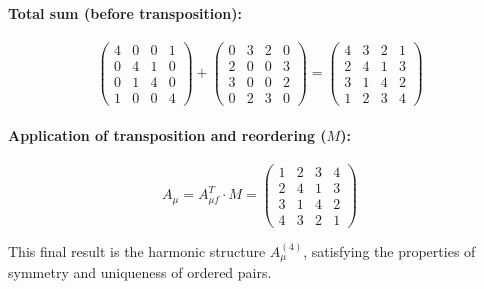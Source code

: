 \documentclass{article}
\begin{document}
\paragraph{Total sum (before transposition):}


\[
\begin{pmatrix}
4 & 0 & 0 & 1\\
0 & 4 & 1 & 0\\
0 & 1 & 4 & 0\\
1 & 0 & 0 & 4
\end{pmatrix}
+
\begin{pmatrix}
0 & 3 & 2 & 0\\
2 & 0 & 0 & 3\\
3 & 0 & 0 & 2\\
0 & 2 & 3 & 0
\end{pmatrix}
=
\begin{pmatrix}
4 & 3 & 2 & 1\\
2 & 4 & 1 & 3\\
3 & 1 & 4 & 2\\
1 & 2 & 3 & 4
\end{pmatrix}
\]

\paragraph{Application of transposition and reordering (\(M\)):}


\[
A_\mu = A_{\mu f}^T \cdot M =
\begin{pmatrix}
1 & 2 & 3 & 4\\
2 & 4 & 1 & 3\\
3 & 1 & 4 & 2\\
4 & 3 & 2 & 1
\end{pmatrix}
\]

This final result is the harmonic structure \(A_\mu^{(4)}\), satisfying the properties of symmetry and uniqueness of ordered pairs.
\end{document}
